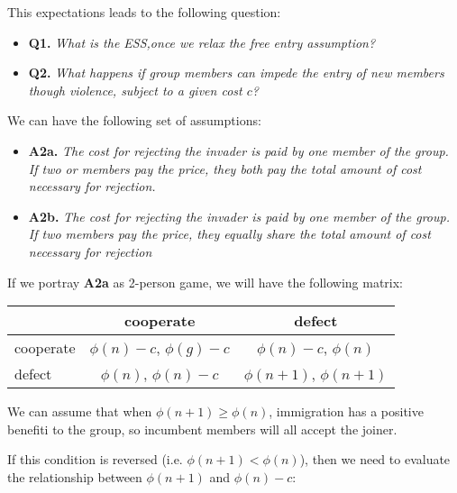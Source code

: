 \documentclass{article}
\begin{document}
This expectations leads to the following question:

\begin{itemize}
\item {\bf Q1.} \emph{What is the ESS,once we relax the free entry assumption?}
\item {\bf Q2.} \emph{What happens if group members can impede the entry of new members though violence, subject to a given cost $c$?}
\end{itemize}

We can have the following set of assumptions:

\begin{itemize}
\item {\bf A2a.} \emph{The cost for rejecting the invader is paid by one member of the group. If two or members pay the price, they both pay the total amount of cost necessary for rejection.}
\item {\bf A2b.} \emph{The cost for rejecting the invader is paid by one member of the group. If two members pay the price, they equally share the total amount of cost necessary for rejection}
\end{itemize}

If we portray {\bf A2a} as 2-person game, we will have the following matrix:


\begin{center}
\begin{tabular} {|l|c|c|}
\hline
 &cooperate&defect \\ \hline
cooperate&$\phi(n)-c$, $\phi(g)-c$&$\phi(n)-c$, $\phi(n)$ \\ \hline
defect&$\phi(n)$, $\phi(n)-c$&$\phi(n+1)$, $\phi(n+1)$ \\ \hline
\end{tabular}
\end{center}


We can assume that when $\phi(n+1)\geq\phi(n)$, immigration has a positive benefiti to the group, so incumbent members will all accept the joiner.

If this condition is reversed (i.e. $\phi(n+1)<\phi(n)$), then we need to evaluate the relationship between $\phi(n+1)$ and $\phi(n)-c$:
\end{document}
